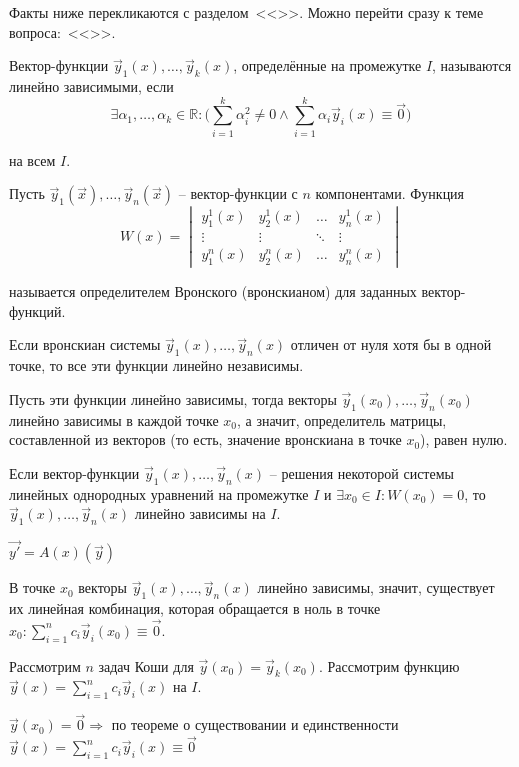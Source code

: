 \setcounter{equation}{0}

Факты ниже перекликаются с разделом~<<>>. Можно перейти сразу к теме вопроса:~<<>>.

\Def Вектор-функции $\vec{y}_1(x), \ldots , \vec{y}_k(x)$, определённые на промежутке $I$, называются линейно зависимыми, если
$$\exists \alpha_1, \ldots , \alpha_k \in \mathbb{R} : 
\Big( \sum\limits_{i=1}^k \alpha_i^2 \neq 0 \wedge \sum\limits_{i=1}^k \alpha_i\vec{y}_i(x) \equiv \vec{0} \Big)$$

на всем $I$.

\Def Пусть $\vec{y}_1(\vec{x}), \ldots , \vec{y}_n(\vec{x})$ -- вектор-функции с $n$ компонентами. Функция
$$W(x) = 
\begin{vmatrix}
  y_1^1(x)& y_2^1(x)& \ldots& y_n^1(x)\\
  \vdots& \vdots& \ddots& \vdots\\
  y_1^n(x)& y_2^n(x)& \ldots& y_n^n(x)
\end{vmatrix}$$

называется определителем Вронского (вронскианом) для заданных вектор-функций.

\Lemma Если вронскиан системы $\vec{y}_1(x), \ldots , \vec{y}_n(x)$ отличен от нуля хотя бы в одной
точке, то все эти функции линейно независимы.

\Proof
Пусть эти функции линейно зависимы, тогда векторы $\vec{y}_1(x_0), \ldots , \vec{y}_n(x_0)$ линейно зависимы в каждой точке $x_0$, а значит, определитель матрицы, составленной из векторов (то есть, значение вронскиана в точке $x_0$), равен нулю.
\EndProof

\Lemma Если вектор-функции $\vec{y}_1(x), \ldots , \vec{y}_n(x)$ -- решения некоторой системы линейных однородных уравнений на промежутке $I$ и $\exists x_0 \in I: W(x_0) = 0$, то $\vec{y}_1(x), \ldots , \vec{y}_n(x)$ линейно зависимы на $I$.

\Proof
$\vec{y'} = A(x)(\vec{y})$

В точке $x_0$ векторы $\vec{y}_1(x), \ldots, \vec{y}_n(x)$ линейно зависимы, значит, существует их линейная комбинация, которая обращается в ноль в точке $x_0 : \sum\limits_{i=1}^nc_i\vec{y}_i(x_0) \equiv \vec{0}$.

Рассмотрим $n$ задач Коши для $\vec{y}(x_0) = \vec{y}_k(x_0)$. Рассмотрим функцию $\vec{y}(x) = \sum\limits_{i=1}^nc_i\vec{y}_i(x)$ на $I$. 

$\vec{y}(x_0) = \vec{0} \Rightarrow$ по теореме о существовании и единственности $\vec{y}(x) = \sum\limits_{i=1}^nc_i\vec{y}_i(x) \equiv \vec{0}$
\EndProof

